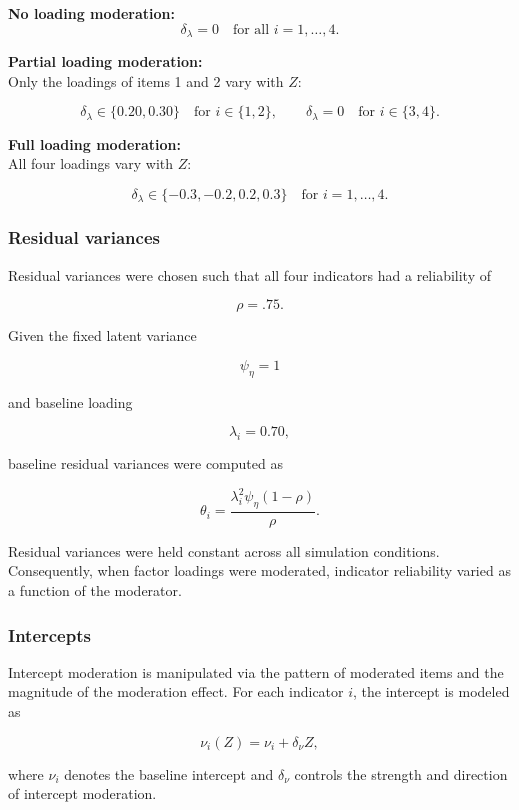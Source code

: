 \documentclass[
  man,
  floatsintext]{apa7}
\begin{document}
\textbf{No loading moderation:}\\
\[
\delta_{\lambda}=0 \quad \text{for all } i=1,\dots,4.
\]

\textbf{Partial loading moderation:}\\
Only the loadings of items 1 and 2 vary with \(Z\):

\[
\delta_{\lambda} \in \{0.20,0.30\}
\quad \text{for } i \in \{1,2\},
\qquad
\delta_{\lambda}=0
\quad \text{for } i \in \{3,4\}.
\]

\textbf{Full loading moderation:}\\
All four loadings vary with \(Z\):

\[
\delta_{\lambda} \in \{-0.3,-0.2,0.2,0.3\}
\quad \text{for } i=1,\dots,4.
\]

\subsubsection{Residual variances}\label{residual-variances}

Residual variances were chosen such that all four indicators had a
reliability of

\[
\rho = .75.
\]

Given the fixed latent variance

\[
\psi_\eta = 1
\]

and baseline loading

\[
\lambda_i = 0.70,
\]

baseline residual variances were computed as

\[
\theta_i =
\frac{\lambda_i^2\psi_\eta(1-\rho)}
{\rho}.
\]

Residual variances were held constant across all simulation conditions.
Consequently, when factor loadings were moderated, indicator reliability
varied as a function of the moderator.

\subsubsection{Intercepts}\label{intercepts}

Intercept moderation is manipulated via the pattern of moderated items
and the magnitude of the moderation effect. For each indicator \(i\),
the intercept is modeled as

\[
\nu_i(Z) = \nu_i + \delta_{\nu} Z,
\]

where \(\nu_i\) denotes the baseline intercept and \(\delta_{\nu}\)
controls the strength and direction of intercept moderation.
\end{document}
